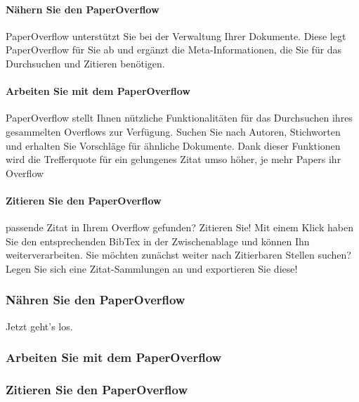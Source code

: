 \documentclass[a4paper,12pt]{article}
\begin{document}
\paragraph{Nähern Sie den PaperOverflow}
PaperOverflow unterstützt Sie bei der Verwaltung Ihrer Dokumente. Diese legt PaperOverflow für Sie ab und ergänzt die Meta-Informationen, die Sie für das Durchsuchen und Zitieren benötigen.

\paragraph{Arbeiten Sie mit dem PaperOverflow}
PaperOverflow stellt Ihnen nützliche Funktionalitäten für das Durchsuchen ihres gesammelten Overflows zur Verfügung. Suchen Sie nach Autoren, Stichworten und erhalten Sie Vorschläge für ähnliche Dokumente. Dank dieser Funktionen wird die Trefferquote für ein gelungenes Zitat umso höher, je mehr Papers ihr Overflow 

\paragraph{Zitieren Sie den PaperOverflow}
passende Zitat in Ihrem Overflow gefunden? Zitieren Sie! Mit einem Klick haben Sie den entsprechenden BibTex in der Zwischenablage und können Ihn weiterverarbeiten. Sie möchten zunächst weiter nach Zitierbaren Stellen suchen? Legen Sie sich eine Zitat-Sammlungen an und exportieren Sie diese!

\pagebreak

\subsubsection{Nähren Sie den PaperOverflow}
Jetzt geht's los.

\subsubsection{Arbeiten Sie mit dem PaperOverflow}

\subsubsection{Zitieren Sie den PaperOverflow}
\end{document}
